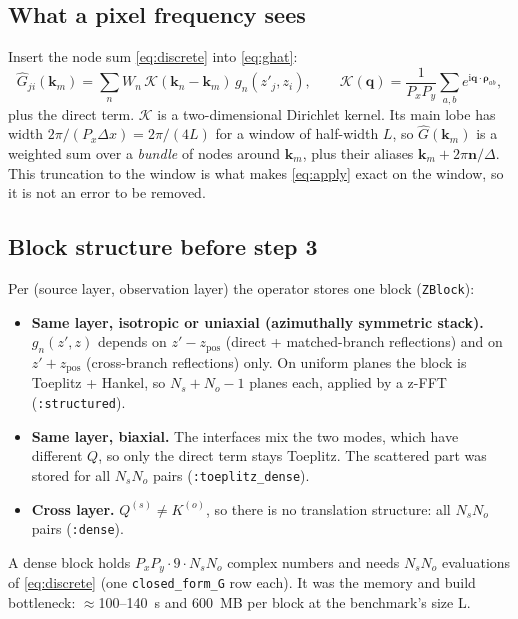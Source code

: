 \documentclass[11pt,a4paper]{article}
\newcommand{\code}[1]{\texttt{#1}}
\newcommand{\kn}{\mathbf{k}_n}
\newcommand{\km}{\mathbf{k}_m}
\newcommand{\bfrho}{\boldsymbol{\rho}}
\newcommand{\Ghat}{\widehat{G}}
\newcommand{\ii}{\mathrm{i}}
\theoremstyle{remark}
\begin{document}
\subsection{What a pixel frequency sees}

Insert the node sum \eqref{eq:discrete} into \eqref{eq:ghat}:
\begin{equation}
  \Ghat_{ji}(\km) = \sum_n W_n\, \mathcal{K}(\kn - \km)\, g_n(z'_j, z_i),
  \qquad
  \mathcal{K}(\mathbf{q}) = \frac{1}{P_xP_y}\sum_{a,b} e^{\ii\mathbf{q}\cdot\bfrho_{ab}},
  \label{eq:kernel}
\end{equation}
plus the direct term. $\mathcal{K}$ is a two-dimensional Dirichlet kernel. Its main lobe has width
$2\pi/(P_x\Delta x)=2\pi/(4L)$ for a window of half-width $L$, so $\Ghat(\km)$ is a
weighted sum over a \emph{bundle} of nodes around $\km$, plus their aliases $\km+2\pi\mathbf{n}/\Delta$.
This truncation to the window is what makes \eqref{eq:apply} exact on the window, so it is not an error to be removed.

\subsection{Block structure before step 3}

Per (source layer, observation layer) the operator stores one block (\code{ZBlock}):
\begin{itemize}[leftmargin=*]
\item \textbf{Same layer, isotropic or uniaxial (azimuthally symmetric stack).} $g_n(z',z)$ depends on $z'-z_{\mathrm{pos}}$ (direct + matched-branch
  reflections) and on $z'+z_{\mathrm{pos}}$ (cross-branch reflections) only. On uniform planes the block is
  Toeplitz + Hankel, so $N_s+N_o-1$ planes each, applied by a z-FFT (\code{:structured}).
\item \textbf{Same layer, biaxial.} The interfaces mix the two modes, which have different $Q$, so only the
  direct term stays Toeplitz. The scattered part was stored for all $N_s N_o$ pairs (\code{:toeplitz\_dense}).
\item \textbf{Cross layer.} $Q^{(s)}\ne K^{(o)}$, so there is no translation structure: all $N_sN_o$ pairs (\code{:dense}).
\end{itemize}
A dense block holds $P_xP_y\cdot 9\cdot N_s N_o$ complex numbers and needs $N_s N_o$ evaluations of
\eqref{eq:discrete} (one \code{closed\_form\_G} row each). It was the memory and build bottleneck:
\(\approx\)100--140~s and 600~MB per block at the benchmark's size L.
\end{document}
